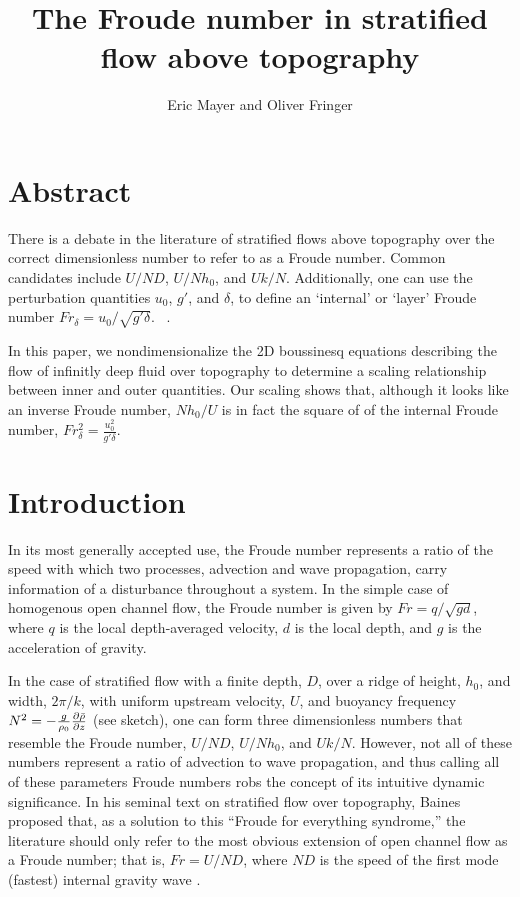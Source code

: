 \documentclass[12pt]{article}
\begin{document}
	
	\title{The Froude number in stratified flow above topography}
	
	\author{Eric Mayer and Oliver Fringer}
	
	\maketitle
	
	\section{Abstract}
	
	There is a debate in the literature of stratified flows above topography over the correct dimensionless number to refer to as a Froude number. Common candidates include $U/ND$, $U/Nh_0$, and $Uk/N$. 
	Additionally, one can use the perturbation quantities $u_0$, $g'$, and $\delta$, to define an `internal' or `layer' Froude number $Fr_{\delta}=u_0/\sqrt{g'\delta}$. ~\citep{Rossby1951,Winters2012}. 
	
	In this paper, we nondimensionalize the 2D boussinesq equations describing the flow of infinitly deep fluid over topography to determine a scaling relationship between inner and outer quantities. Our scaling shows that, although it looks like an inverse Froude number, $Nh_0/U$ is in fact the square of of the internal Froude number, $Fr_{\delta}^2=\frac{u_0^2}{g'\delta}$. 
	
	
	
	\section{Introduction}
	
	In its most generally accepted use, the Froude number represents a ratio of the speed with which two processes,  advection and wave propagation, carry information of a disturbance throughout a system. In the simple case of homogenous open channel flow, the Froude number is given by $Fr=q/\sqrt{gd}$, where $q$ is the  local depth-averaged velocity, $d$ is the local depth, and $g$ is the acceleration of gravity. 
	
	In the case of stratified flow with a finite depth, $D$, over a ridge of height, $h_0$, and width, $2\pi/k$, with uniform upstream velocity, $U$, and buoyancy frequency $N^2=-\frac{g}{\rho_0}\frac{\partial{\bar{\rho}}}{\partial{z}}$ (see sketch), one can form three dimensionless numbers that resemble the Froude number, $U/ND$, $U/Nh_0$, and $Uk/N$. However, not all of these numbers represent a ratio of advection to wave propagation, and thus calling all of these parameters Froude numbers robs the concept of its intuitive dynamic significance. In his seminal text on stratified flow over topography, Baines proposed that, as a solution to this ``Froude for everything syndrome,'' the literature should only refer to the most obvious extension of open channel flow as a Froude number; that is,  $Fr=U/ND$, where $ND$ is the speed of the first mode (fastest) internal gravity wave \citep{Baines1995}. 
	
\end{document}
